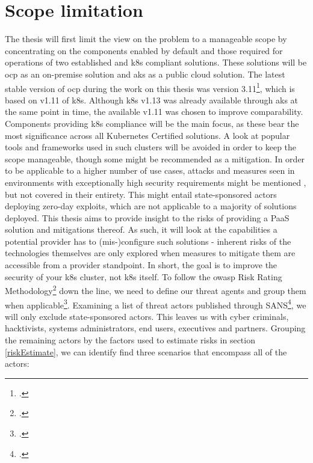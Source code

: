 \section{Scope limitation} \label{scopeLimit}

The thesis will first limit the view on the problem to a manageable scope by concentrating on the components enabled by default and those required for operations of two established and \gls{k8s} compliant solutions.
These solutions will be \gls{ocp} as an on-premise solution and \gls{aks} as a public cloud solution. 
The latest stable version of \gls{ocp} during the work on this thesis was version 3.11\footcite{ocpRelease}, which is based on v1.11 of \gls{k8s}.
Although \gls{k8s} v1.13 was already available through \gls{aks} at the same point in time, the available v1.11 was chosen to improve comparability.
Components providing \gls{k8s} compliance will be the main focus, as these bear the most significance across all Kubernetes Certified solutions. 
A look at popular tools and frameworks used in such clusters will be avoided in order to keep the scope manageable, though some might be recommended as a mitigation.
In order to be applicable to a higher number of use cases, attacks and measures seen in environments with exceptionally high security requirements might be mentioned , but not  covered in their entirety. This might entail state-sponsored actors deploying zero-day exploits, which are not applicable to a majority of solutions deployed.
This thesis aims to provide insight to the risks of providing a PaaS solution and mitigations thereof. 
As such, it will look at the capabilities a potential provider has to (mis-)configure such solutions - inherent risks of the technologies themselves are only explored when measures to mitigate them are accessible from a provider standpoint. 
In short, the goal is to improve the security of your \gls{k8s} cluster, not \gls{k8s} itself.
To follow the \gls{owasp} Risk Rating Methodology\footcite{riskRating} down the line, we need to define our threat agents and group them when applicable\footcite[][, Section 'Define all possible threats']{threatModeling}. Examining a list of threat actors published through SANS\footcite[][p. 12 to 17]{sansThreatActors}, we will only exclude state-sponsored actors. This leaves us with cyber criminals, hacktivists, systems administrators, end users, executives and partners.
Grouping the remaining actors by the factors used to estimate risks in section \ref{riskEstimate}, we can identify find three scenarios that encompass all of the actors:
